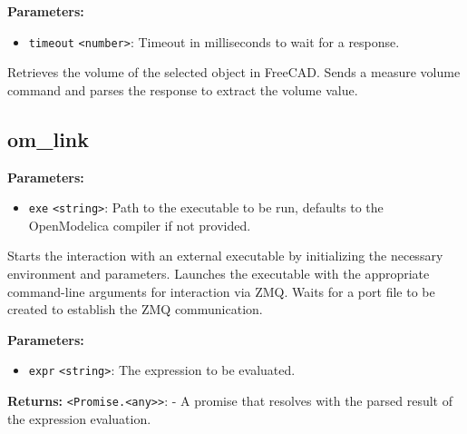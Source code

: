 \documentclass[12pt,a4paper]{article}
\begin{document}
\vspace{5mm}
\noindent {}


\noindent \textbf{Parameters:}
\begin{itemize}
  \item \texttt{timeout} \texttt{<number>}: Timeout in milliseconds to wait for a response.
\end{itemize}

\noindent Retrieves the volume of the selected object in FreeCAD.
Sends a measure volume command and parses the response to extract the volume value.


\subsection{om\_link}
\vspace{5mm}
\noindent {}


\noindent \textbf{Parameters:}
\begin{itemize}
  \item \texttt{exe} \texttt{<string>}: Path to the executable to be run, defaults to the OpenModelica compiler if not provided.
\end{itemize}

\noindent Starts the interaction with an external executable by initializing the necessary environment and parameters.
Launches the executable with the appropriate command-line arguments for interaction via ZMQ.
Waits for a port file to be created to establish the ZMQ communication.

\vspace{5mm}
\noindent {}


\noindent \textbf{Parameters:}
\begin{itemize}
  \item \texttt{expr} \texttt{<string>}: The expression to be evaluated.
\end{itemize}

\noindent \textbf{Returns:} \texttt{<Promise.<any>>}: - A promise that resolves with the parsed result of the expression evaluation.
\end{document}
